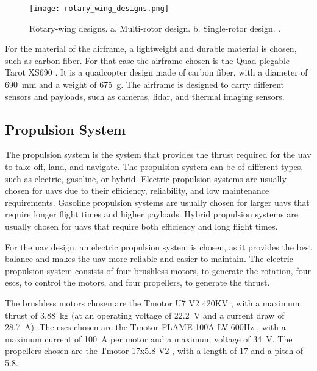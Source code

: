 \begin{figure}
	\texttt{[image: rotary\_wing\_designs.png]}
	\caption{Rotary-wing designs. a. Multi-rotor design. b. Single-rotor design. \autocite{rotary_wing_designs}.}\label{fig:rotary_wing_designs}
\end{figure}

For the material of the airframe, a lightweight and durable material is chosen, such as carbon fiber. For that case the airframe chosen is the Quad plegable Tarot XS690 \autocite{rcinnovationsQuadPlegable}. It is a quadcopter design made of carbon fiber, with a diameter of \SI{690}{\milli\meter} and a weight of \SI{675}{\gram}. The airframe is designed to carry different sensors and payloads, such as cameras, lidar, and thermal imaging sensors.

\subsection{Propulsion System}\label{subsec:design_propulsion_system}

The propulsion system is the system that provides the thrust required for the \gls{uav} to take off, land, and navigate. The propulsion system can be of different types, such as electric, gasoline, or hybrid. Electric propulsion systems are usually chosen for \glspl{uav} due to their efficiency, reliability, and low maintenance requirements. Gasoline propulsion systems are usually chosen for larger \glspl{uav} that require longer flight times and higher payloads. Hybrid propulsion systems are usually chosen for \glspl{uav} that require both efficiency and long flight times.

For the \gls{uav} design, an electric propulsion system is chosen, as it provides the best balance and makes the \gls{uav} more reliable and easier to maintain. The electric propulsion system consists of four brushless motors, to generate the rotation, four \glspl{esc}, to control the motors, and four propellers, to generate the thrust.

The brushless motors chosen are the Tmotor U7 V2 420KV \autocite{rcinnovationsTmotor420KV}, with a maximum thrust of \SI{3.88}{\kilo\gram} (at an operating voltage of \SI{22.2}{\volt} and a current draw of \SI{28.7}{\ampere}). The \glspl{esc} chosen are the Tmotor FLAME 100A LV 600Hz \autocite{rcinnovationsVariadorTmotor}, with a maximum current of \SI{100}{\ampere} per motor and a maximum voltage of \SI{34}{\volt}. The propellers chosen are the Tmotor 17x5.8 V2 \autocite{rcinnovationsTmotor17x58}, with a length of \SI{17}{\inch} and a pitch of \SI{5.8}{\inch}.

